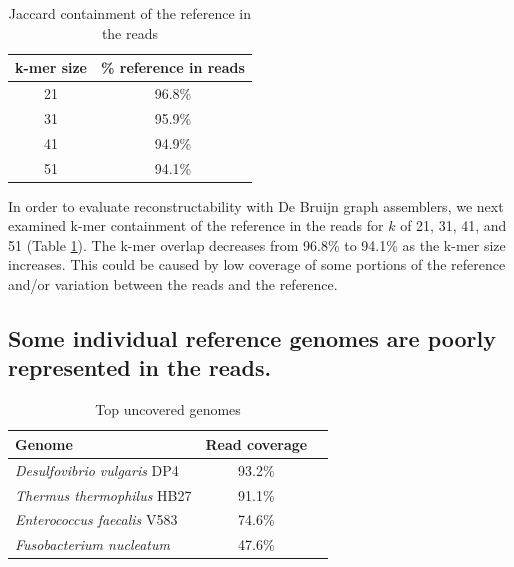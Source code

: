 \documentclass[11pt]{article}
\begin{document}
\begin{table}[t]
\caption{Jaccard containment of the reference in the reads}
\centering
\begin{tabular}{|c|c|}
\hline
\textbf{k-mer size} & {\textbf \% reference in reads } \\ [0.5ex]
\hline
21 & 96.8\% \\
\hline
31 & 95.9\% \\
\hline
41 & 94.9\% \\
\hline
51 & 94.1\% \\
\hline
\end{tabular}
\label{table:ref_in_reads}
\end{table}

In order to evaluate reconstructability with De Bruijn graph
assemblers, we next examined k-mer containment of the reference in the
reads for $k$ of 21, 31, 41, and 51 (Table \ref{table:ref_in_reads}).
The k-mer overlap decreases from 96.8\% to 94.1\% as the k-mer size
increases. This could be caused by low coverage of some portions
of the reference and/or variation between the reads and the reference.



\subsection*{Some individual reference genomes are poorly represented in the reads.}


\begin{table}[!h]
\centering
\caption{Top uncovered genomes}
\begin{tabular}{|l|c|c|}\hline
\textbf{Genome} & \textbf {Read coverage} \\ \hline 

{{\em Desulfovibrio vulgaris} DP4}  & 93.2\% \\
\hline
{{\em Thermus thermophilus} HB27}  & 91.1\% \\
\hline
{{\em Enterococcus faecalis} V583}  & 74.6\% \\
\hline
{{\em Fusobacterium nucleatum}}  & 47.6\% \\
\hline
\end{tabular}
\label{table:genomes_uncovered-analysis}
\end{table}
\end{document}
